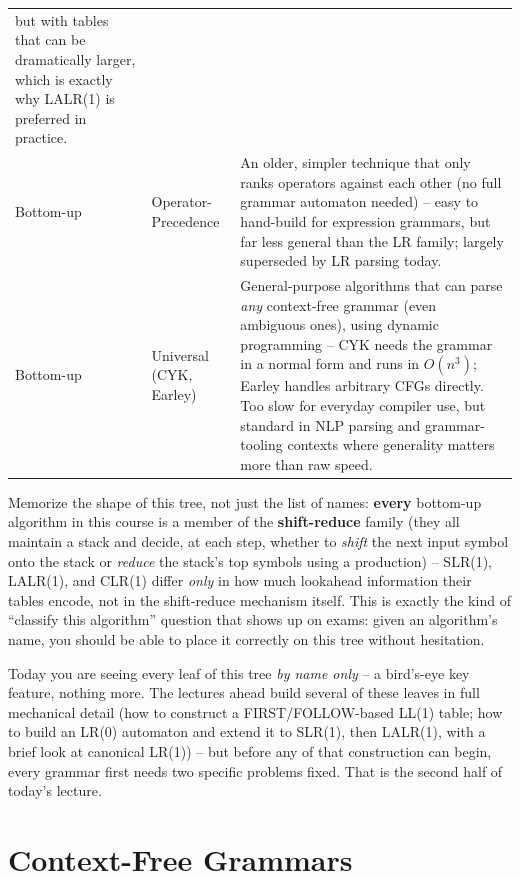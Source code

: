 \documentclass[full-course-notes.tex]{subfiles}
\begin{document}
\begin{center}
\begin{tabularx}{\textwidth}{@{}l l X@{}}
but with tables that can be dramatically larger, which is exactly why LALR(1) is preferred in
practice. \\
Bottom-up & Operator-Precedence & An older, simpler technique that only ranks operators against
each other (no full grammar automaton needed) -- easy to hand-build for expression grammars,
but far less general than the LR family; largely superseded by LR parsing today. \\
Bottom-up & Universal (CYK, Earley) & General-purpose algorithms that can parse \emph{any}
context-free grammar (even ambiguous ones), using dynamic programming -- CYK needs the grammar
in a normal form and runs in $O(n^3)$; Earley handles arbitrary CFGs directly. Too slow for
everyday compiler use, but standard in NLP parsing and grammar-tooling contexts where
generality matters more than raw speed. \\
\bottomrule
\end{tabularx}
\end{center}

\begin{examfocus}
Memorize the shape of this tree, not just the list of names: \textbf{every} bottom-up algorithm
in this course is a member of the \textbf{shift-reduce} family (they all maintain a stack and
decide, at each step, whether to \emph{shift} the next input symbol onto the stack or
\emph{reduce} the stack's top symbols using a production) -- SLR(1), LALR(1), and CLR(1) differ
\emph{only} in how much lookahead information their tables encode, not in the shift-reduce
mechanism itself. This is exactly the kind of ``classify this algorithm'' question that shows
up on exams: given an algorithm's name, you should be able to place it correctly on this tree
without hesitation.
\end{examfocus}

\begin{coreidea}
Today you are seeing every leaf of this tree \emph{by name only} -- a bird's-eye key feature,
nothing more. The lectures ahead build several of these leaves in full mechanical detail (how
to construct a FIRST/FOLLOW-based LL(1) table; how to build an LR(0) automaton and extend it to
SLR(1), then LALR(1), with a brief look at canonical LR(1)) -- but before any of that
construction can begin, every grammar first needs two specific problems fixed. That is the
second half of today's lecture.
\end{coreidea}

\section{Context-Free Grammars}
\label{sec:l8-cfg}
\end{document}
